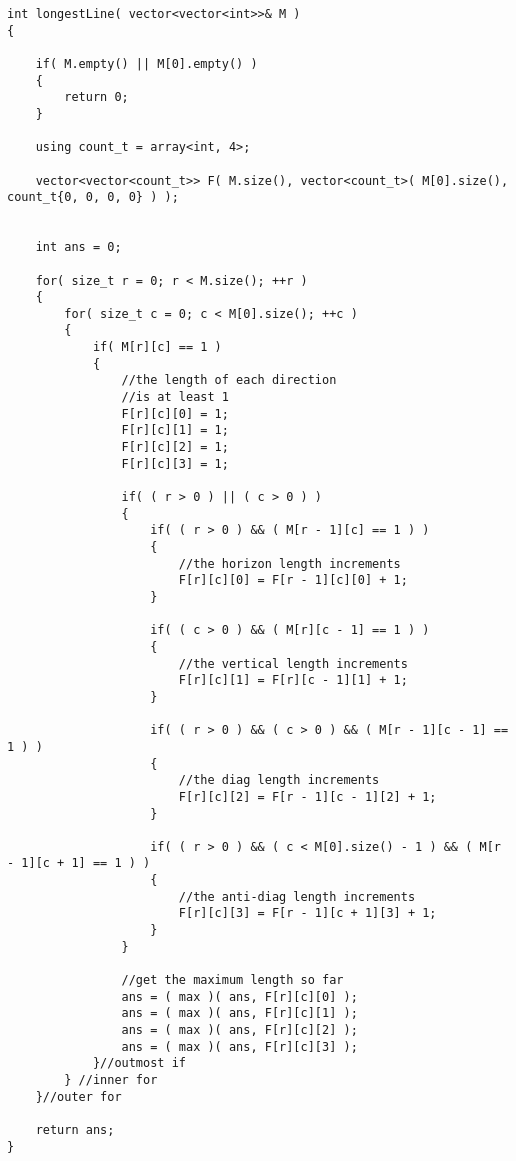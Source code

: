 \setcounter{lstlisting}{0}
\begin{lstlisting}[style=customc, caption={Dynamic Programming}]
int longestLine( vector<vector<int>>& M )
{

    if( M.empty() || M[0].empty() )
    {
        return 0;
    }

    using count_t = array<int, 4>;

    vector<vector<count_t>> F( M.size(), vector<count_t>( M[0].size(), count_t{0, 0, 0, 0} ) );


    int ans = 0;

    for( size_t r = 0; r < M.size(); ++r )
    {
        for( size_t c = 0; c < M[0].size(); ++c )
        {
            if( M[r][c] == 1 )
            {
                //the length of each direction
                //is at least 1
                F[r][c][0] = 1;
                F[r][c][1] = 1;
                F[r][c][2] = 1;
                F[r][c][3] = 1;

                if( ( r > 0 ) || ( c > 0 ) )
                {
                    if( ( r > 0 ) && ( M[r - 1][c] == 1 ) )
                    {
                        //the horizon length increments
                        F[r][c][0] = F[r - 1][c][0] + 1;
                    }

                    if( ( c > 0 ) && ( M[r][c - 1] == 1 ) )
                    {
                        //the vertical length increments
                        F[r][c][1] = F[r][c - 1][1] + 1;
                    }

                    if( ( r > 0 ) && ( c > 0 ) && ( M[r - 1][c - 1] == 1 ) )
                    {
                        //the diag length increments
                        F[r][c][2] = F[r - 1][c - 1][2] + 1;
                    }

                    if( ( r > 0 ) && ( c < M[0].size() - 1 ) && ( M[r - 1][c + 1] == 1 ) )
                    {
                        //the anti-diag length increments
                        F[r][c][3] = F[r - 1][c + 1][3] + 1;
                    }
                }

                //get the maximum length so far
                ans = ( max )( ans, F[r][c][0] );
                ans = ( max )( ans, F[r][c][1] );
                ans = ( max )( ans, F[r][c][2] );
                ans = ( max )( ans, F[r][c][3] );
            }//outmost if
        } //inner for
    }//outer for

    return ans;
}
\end{lstlisting}